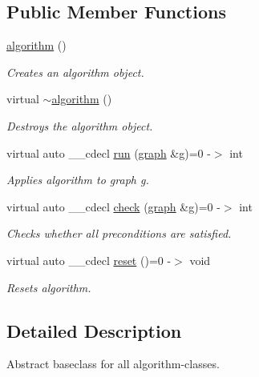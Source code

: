 \subsection*{Public Member Functions}
\begin{DoxyCompactItemize}
\item 
\mbox{\label{classalgorithm_ab79e1ddec2f2afdf4b36b10724db8b15}} 
\mbox{\hyperlink{classalgorithm_ab79e1ddec2f2afdf4b36b10724db8b15}{algorithm}} ()
\begin{DoxyCompactList}\small\item\em Creates an algorithm object. \end{DoxyCompactList}\item 
\mbox{\label{classalgorithm_adca9b1e7fa3afd914519a9dbb44e9fd5}} 
virtual \mbox{\hyperlink{classalgorithm_adca9b1e7fa3afd914519a9dbb44e9fd5}{$\sim$algorithm}} ()
\begin{DoxyCompactList}\small\item\em Destroys the algorithm object. \end{DoxyCompactList}\item 
virtual auto \+\_\+\+\_\+cdecl \mbox{\hyperlink{classalgorithm_a482eb28cacba018b5a86d3a819a50a2f}{run}} (\mbox{\hyperlink{classgraph}{graph}} \&g)=0 -\/$>$ int
\begin{DoxyCompactList}\small\item\em Applies algorithm to graph g. \end{DoxyCompactList}\item 
virtual auto \+\_\+\+\_\+cdecl \mbox{\hyperlink{classalgorithm_a05c0f25463eb35a77b2d73fc06bb2c0e}{check}} (\mbox{\hyperlink{classgraph}{graph}} \&g)=0 -\/$>$ int
\begin{DoxyCompactList}\small\item\em Checks whether all preconditions are satisfied. \end{DoxyCompactList}\item 
virtual auto \+\_\+\+\_\+cdecl \mbox{\hyperlink{classalgorithm_aea645f2e39976a477c8f8564656fd1b6}{reset}} ()=0 -\/$>$ void
\begin{DoxyCompactList}\small\item\em Resets algorithm. \end{DoxyCompactList}\end{DoxyCompactItemize}


\subsection{Detailed Description}
Abstract baseclass for all algorithm-\/classes. 

